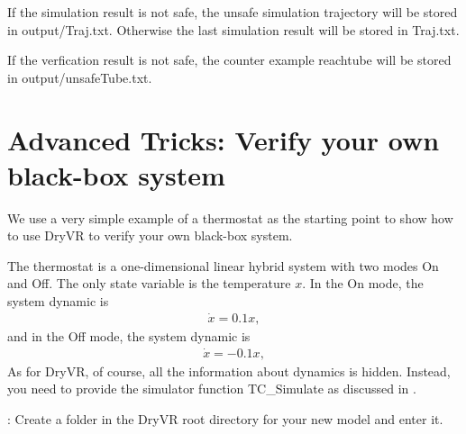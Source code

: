 \documentclass[letterpaper,10pt,english]{sphinxmanual}
\begin{document}
If the simulation result is not safe, the unsafe simulation trajectory will be stored in \sphinxquotedblleft{}output/Traj.txt\sphinxquotedblright{}.
Otherwise the last simulation result will be stored in \sphinxquotedblleft{}Traj.txt\sphinxquotedblright{}.

If the verfication result is not safe, the counter example reachtube will be stored in \sphinxquotedblleft{}output/unsafeTube.txt\sphinxquotedblright{}.


\section{Advanced Tricks: Verify your own black-box system}
\label{\detokenize{dryvr's_language:advance-label}}\label{\detokenize{dryvr's_language:advanced-tricks-verify-your-own-black-box-system}}
We use a very simple example of a thermostat as the starting point to show how to use DryVR to verify your own black-box system.

The thermostat is a one-dimensional linear hybrid system with two modes \sphinxquotedblleft{}On\sphinxquotedblright{} and \sphinxquotedblleft{}Off\sphinxquotedblright{}. The only state variable is the temperature \(x\). In the \sphinxquotedblleft{}On\sphinxquotedblright{} mode, the system dynamic is
\begin{equation*}
\begin{split}\dot{x} = 0.1 x,\end{split}
\end{equation*}
and in the \sphinxquotedblleft{}Off\sphinxquotedblright{} mode, the system dynamic is
\begin{equation*}
\begin{split}\dot{x} = -0.1 x,\end{split}
\end{equation*}
As for DryVR, of course, all the information about dynamics is hidden. Instead, you need to provide the simulator function TC\_Simulate as discussed in {\hyperref[\detokenize{dryvr's_language:black-box-label}]{}}.

:
Create a folder in the DryVR root directory for your new model and enter it.

\begin{sphinxVerbatim}[commandchars=\\\{\}]
 
 
 
\end{sphinxVerbatim}
\end{document}
